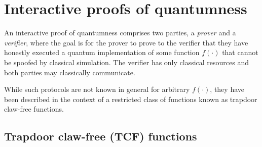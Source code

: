 \section{Interactive proofs of quantumness} \label{sec:IPQ}



%

An interactive proof of quantumness \cite{Liu22, Zhu23} comprises two parties, a \emph{prover} and a \emph{verifier}, where the goal is for the prover to prove to the verifier that they have honestly executed a quantum implementation of some function $f(\cdot)$ that cannot be spoofed by classical simulation. The verifier has only classical resources and both parties may classically communicate.

While such protocols are not known in general for arbitrary $f(\cdot)$, they have been described in the context of a restricted class of functions known as trapdoor claw-free functions.

\subsection{Trapdoor claw-free (TCF) functions}

